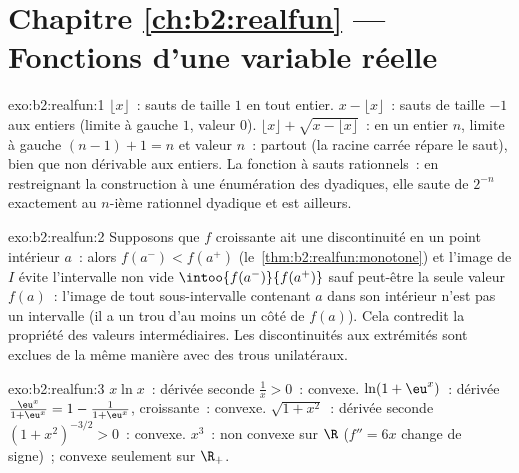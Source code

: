 \section*{Chapitre \ref{ch:b2:realfun} --- Fonctions d'une variable réelle}

\begin{solution}{exo:b2:realfun:1}
$\lfloor x\rfloor$~: sauts de taille $1$ en tout entier. $x -
\lfloor x\rfloor$~: sauts de taille $-1$ aux entiers (limite à
gauche $1$, valeur $0$). $\lfloor x\rfloor + \sqrt{x - \lfloor
x\rfloor}$~: en un entier $n$, limite à gauche $(n - 1) + 1 = n$ et
valeur $n$~: \emph{} partout (la racine carrée répare le
saut), bien que non dérivable aux entiers. La fonction à sauts
rationnels~: en restreignant la construction à une énumération des
dyadiques, elle saute de $2^{-n}$ exactement au $n$-ième rationnel
dyadique et est  ailleurs.
\end{solution}

\begin{solution}{exo:b2:realfun:2}
Supposons que $f$ croissante ait une discontinuité en un point
intérieur $a$~: alors $f(a^-) < f(a^+)$
(le~\cref{thm:b2:realfun:monotone}) et l'image de $I$ évite
l'intervalle  non vide $\intoo{f(a^-)}{f(a^+)}$ sauf peut-être
la seule valeur $f(a)$~: l'image de tout sous-intervalle contenant
$a$ dans son intérieur n'est pas un intervalle (il a un trou d'au
moins un côté de $f(a)$). Cela contredit la propriété des valeurs
intermédiaires. Les discontinuités aux extrémités sont exclues de la
même manière avec des trous unilatéraux.
\end{solution}

\begin{solution}{exo:b2:realfun:3}
$x\ln x$~: dérivée seconde $\frac1x > 0$~: convexe. $\ln(1 +
\eu^x)$~: dérivée $\frac{\eu^x}{1 + \eu^x} = 1 - \frac{1}{1 +
\eu^x}$, croissante~: convexe. $\sqrt{1 + x^2}$~: dérivée seconde
$(1 + x^2)^{-3/2} > 0$~: convexe. $x^3$~: non convexe sur $\R$ ($f''
= 6x$ change de signe)~; convexe seulement sur $\R_+$.
\end{solution}

